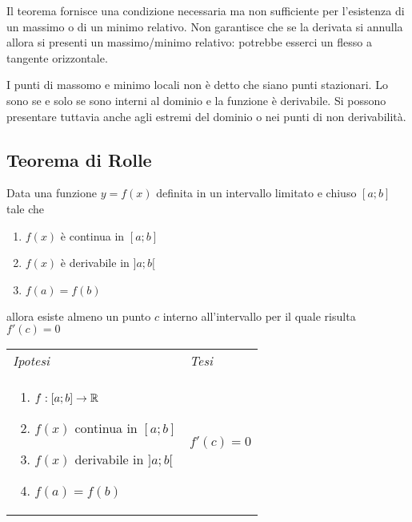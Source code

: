         \begin{oss}[1]
            Il teorema fornisce una condizione necessaria ma non sufficiente per l'esistenza di un massimo o di un minimo relativo. Non garantisce che se la derivata si annulla allora si presenti un massimo/minimo relativo: potrebbe esserci un flesso a tangente orizzontale.
        \end{oss}
        \begin{oss}[2]
            I punti di massomo e minimo locali non è detto che siano punti stazionari. Lo sono se e solo se sono interni al dominio e la funzione è derivabile. Si possono presentare tuttavia anche agli estremi del dominio o nei punti di non derivabilità.
        \end{oss}

    \subsection{Teorema di Rolle}
        \begin{shadedTheorem}[Rolle]
        Data una funzione $y=f(x)$ definita in un intervallo limitato e chiuso $[a;b]$ tale che \begin{enumerate}
            \item $f(x)$ è continua in $[a;b]$
            \item $f(x)$ è derivabile in $]a;b[$
            \item $f(a)=f(b)$
        \end{enumerate}
        allora esiste almeno un punto $c$ interno all'intervallo per il quale risulta $f'(c)=0$
        \end{shadedTheorem}
        \begin{tabular}{m{}m{}}
            \textit{Ipotesi} & \textit{Tesi}  \\
            \begin{enumerate}
            \item $f:[a;b] \to \mathbb{R}$
            \item $f(x)$ continua in $[a;b]$
            \item $f(x)$ derivabile in $]a;b[$
            \item $f(a)=f(b)$
        \end{enumerate} & $f'(c)=0$
        \end{tabular}
        
